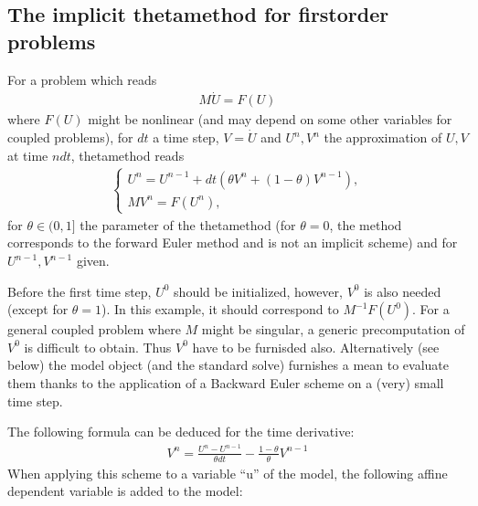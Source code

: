 \documentclass[a4paper,11pt,english]{sphinxmanual}
\begin{document}
\subsection{The implicit theta\sphinxhyphen{}method for first\sphinxhyphen{}order problems}
\label{\detokenize{userdoc/model_time_integration:the-implicit-theta-method-for-first-order-problems}}
For a problem which reads
\begin{equation*}
\begin{split}M\dot{U} = F(U)\end{split}
\end{equation*}
where \(F(U)\) might be nonlinear (and may depend on some other variables for coupled problems), for \(dt\) a time step, \(V = \dot{U}\) and \(U^n, V^n\) the approximation of \(U, V\) at time \(ndt\), theta\sphinxhyphen{}method reads
\begin{equation*}
\begin{split}\left\{ \begin{array}{l}
U^n = U^{n-1} + dt(\theta V^n + (1-\theta) V^{n-1}), \\
MV^n = F(U^n),
\end{array}\right.\end{split}
\end{equation*}
for \(\theta \in (0, 1]\) the parameter of the theta\sphinxhyphen{}method (for \(\theta = 0\), the method corresponds to the forward Euler method and is not an implicit scheme) and for \(U^{n-1}, V^{n-1}\) given.

Before the first time step, \(U^0\) should be initialized, however, \(V^0\) is also needed (except for \(\theta = 1\)). In this example, it should correspond to \(M^{-1}F(U^0)\). For a general coupled problem where \(M\) might be singular, a generic precomputation of \(V^0\) is difficult to obtain. Thus \(V^0\) have to be furnisded also. Alternatively (see below) the model object (and the standard solve) furnishes a mean to evaluate them thanks to the application of a Backward Euler scheme on a (very) small time step.

The following formula can be deduced for the time derivative:
\begin{equation*}
\begin{split}V^n = \frac{U^n - U^{n-1}}{\theta dt} - \frac{1-\theta}{\theta}V^{n-1}\end{split}
\end{equation*}
When applying this scheme to a variable “u” of the model, the following affine dependent variable is added to the model:
\end{document}

